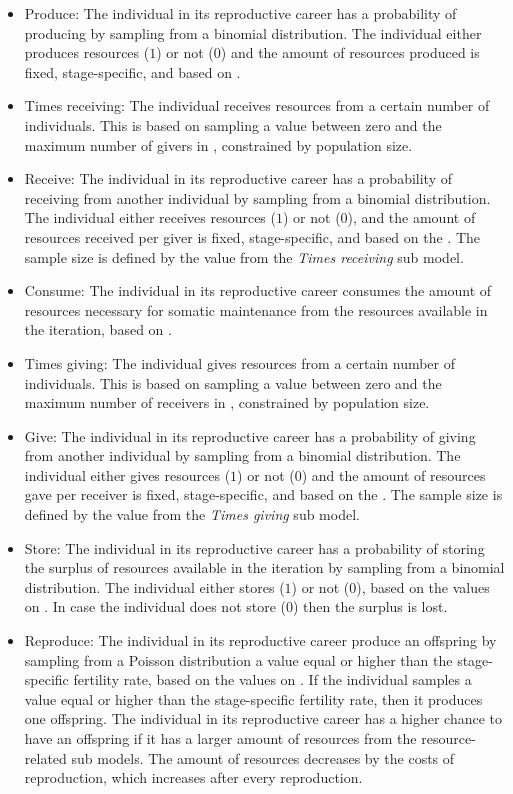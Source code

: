 \documentclass{article}
\begin{document}
\begin{itemize}
\begin{itemize}
        \item Produce: The individual in its reproductive career has a probability of producing by sampling from a binomial distribution. The individual either produces resources ($1$) or not ($0$) and the amount of resources produced is fixed, stage-specific, and based on \cite{koster2020life}.
        \item Times receiving: The individual receives resources from a certain number of individuals. This is based on sampling a value between zero and the maximum number of givers in \cite{gurven2004give}, constrained by population size.
        \item Receive: The individual in its reproductive career has a probability of receiving from another individual by sampling from a binomial distribution. The individual either receives resources ($1$) or not ($0$), and the amount of resources received per giver is fixed, stage-specific, and based on the \cite{gurven2004give}. The sample size is defined by the value from the \emph{Times receiving} sub model. 
        \item Consume: The individual in its reproductive career consumes the amount of resources necessary for somatic maintenance from the resources available in the iteration, based on \cite{kaplan2000theory,pontzer2021daily}.
        \item Times giving: The individual gives resources from a certain number of individuals. This is based on sampling a value between zero and the maximum number of receivers in \cite{gurven2004give}, constrained by population size.
        \item Give: The individual in its reproductive career has a probability of giving from another individual by sampling from a binomial distribution. The individual either gives resources ($1$) or not ($0$) and the amount of resources gave per receiver is fixed, stage-specific, and based on the \cite{gurven2004give}. The sample size is defined by the value from the \emph{Times giving} sub model. 
        \item Store: The individual in its reproductive career has a probability of storing the surplus of resources available in the iteration by sampling from a binomial distribution. The individual either stores ($1$) or not ($0$), based on the values on \citep{bowles2011cultivation}. In case the individual does not store ($0$) then the surplus is lost.
        \item Reproduce: The individual in its reproductive career produce an offspring by sampling from a Poisson distribution a value equal or higher than the stage-specific fertility rate, based on the values on \citep{wood2017dynamics}. If the individual samples a value equal or higher than the stage-specific fertility rate, then it produces one offspring. The individual in its reproductive career has a higher chance to have an offspring if it has a larger amount of resources from the resource-related sub models. The amount of resources decreases by the costs of reproduction, which increases after every reproduction.

\end{itemize}
\end{itemize}
\end{document}
